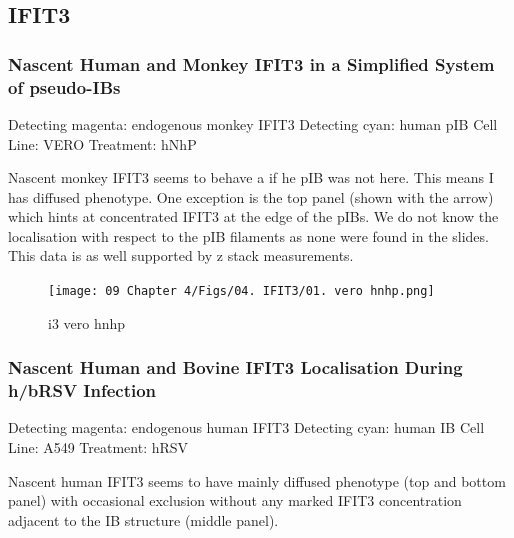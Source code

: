 \subsection{IFIT3} \label{subsec:IFIT3}
\subsubsection{Nascent Human and Monkey IFIT3 in a Simplified System of pseudo-IBs} \label{Nascent Human and Monkey IFIT3 in a Simplified System of pseudo-IBs}
Detecting magenta: endogenous monkey IFIT3 \newline
Detecting cyan: human pIB \newline
Cell Line: VERO \newline
Treatment: hNhP \newline

Nascent monkey IFIT3 seems to behave a if he pIB was not here. This means I has diffused phenotype. One exception is the top panel (shown with the arrow) which hints at concentrated IFIT3 at the edge of the pIBs. We do not know the localisation with respect to the pIB filaments as none were found in the slides. This data is as well supported by z stack measurements.

\begin{figure}
    \centering
    \texttt{[image: 09 Chapter 4/Figs/04. IFIT3/01. vero hnhp.png]}
    \caption[i3 vero hnhp]{i3 vero hnhp}
    \label{fig:i3 vero hnhp}
\end{figure}

\subsubsection{Nascent Human and Bovine IFIT3 Localisation During h/bRSV Infection} \label{Nascent Human and Bovine IFIT3 Localisation During h/bRSV Infection}
 \label{hIFIT3 Localisation During hRSV Infection}
Detecting magenta: endogenous human IFIT3 \newline
Detecting cyan: human IB \newline
Cell Line: A549 \newline
Treatment: hRSV \newline

Nascent human IFIT3 seems to have mainly diffused phenotype (top and bottom panel) with occasional exclusion without any marked IFIT3 concentration adjacent to the IB structure (middle panel).

